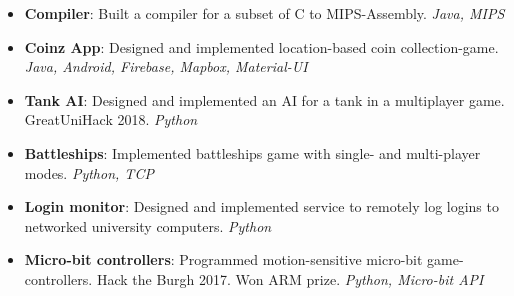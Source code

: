 \documentclass[11pt,a4paper]{article}
\begin{document}


\begin{itemize}
    \item \textbf{Compiler}:
        Built a compiler for a subset of C to MIPS-Assembly.
        \textit{Java, MIPS}
    \item \textbf{Coinz App}:
        Designed and implemented location-based coin collection-game.
        \textit{Java, Android, Firebase, Mapbox, Material-UI}
    \item \textbf{Tank AI}:
        Designed and implemented an AI for a tank in a multiplayer game. GreatUniHack 2018.
        \textit{Python}
    \item \textbf{Battleships}:
        Implemented battleships game with single- and multi-player modes.
        \textit{Python, TCP}
    \item \textbf{Login monitor}:
        Designed and implemented service to remotely log logins to networked university computers.
        \textit{Python}
    \item \textbf{Micro-bit controllers}:
        Programmed motion-sensitive micro-bit game-controllers. Hack the Burgh 2017.
        Won ARM prize.
        \textit{Python, Micro-bit API}
\end{itemize}
\end{document}
